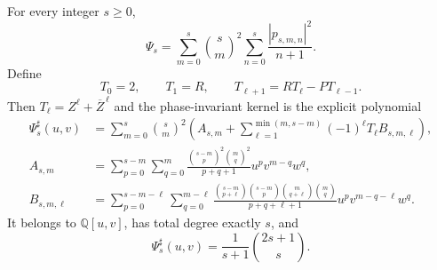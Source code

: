 \begin{theorem}
\label{thm:cueM-U3-trace-descent}
For every integer $s\geq0$,
\begin{equation}
 \Psi_s=\sum_{m=0}^{s}\binom sm^2
 \sum_{n=0}^{s}\frac{|p_{s,m,n}|^2}{n+1}.
 \label{eq:cueM-U3-Hermitian-square}
\end{equation}
Define
\begin{equation}
 T_0=2,\qquad T_1=R,\qquad T_{\ell+1}=RT_\ell-PT_{\ell-1}.
 \label{eq:cueM-U3-trace-recurrence}
\end{equation}
Then $T_\ell=Z^\ell+\overline Z^{\,\ell}$ and the phase-invariant kernel is the explicit
polynomial
\begin{align}
 \Psi_s^\sharp(u,v)
 &=\sum_{m=0}^{s}\binom sm^2\left(
 A_{s,m}+\sum_{\ell=1}^{\min(m,s-m)}(-1)^\ell T_\ell B_{s,m,\ell}
 \right),
 \label{eq:cueM-U3-Psi-general}\\
 A_{s,m}
 &=\sum_{p=0}^{s-m}\sum_{q=0}^{m}
 \frac{\binom{s-m}{p}^2\binom mq^2}{p+q+1}
 u^pv^{m-q}w^q,
 \label{eq:cueM-U3-A-sm}\\
 B_{s,m,\ell}
 &=\sum_{p=0}^{s-m-\ell}\sum_{q=0}^{m-\ell}
 \frac{
 \binom{s-m}{p+\ell}\binom{s-m}{p}
 \binom m{q+\ell}\binom mq
 }{p+q+\ell+1}
 u^pv^{m-q-\ell}w^q.
 \label{eq:cueM-U3-B-sml}
\end{align}
It belongs to $\mathbb Q[u,v]$, has total degree exactly $s$, and
\begin{equation}
 [v^s]\Psi_s^\sharp(u,v)=\frac1{s+1}\binom{2s+1}{s}.
 \label{eq:cueM-U3-v-leading}
\end{equation}
\end{theorem}

